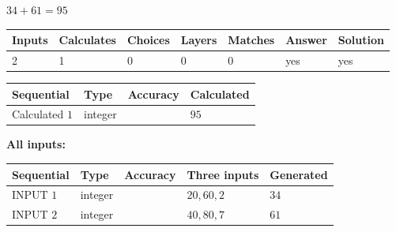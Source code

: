 \documentclass[12pt]{article}
\begin{document}
 
\noindent{}
 
 

 
 
 
\noindent{}
 
 

$ %
34 +  %
61=   %
95$
 
 
\noindent{}
 
 

 
   
   
   
   
\noindent\begin{tabular}{|l|l|l|l|l|l|l|}
 \hline
Inputs & Calculates & Choices & Layers & Matches & Answer & Solution \\ \hline
 2  & 
 1  & 
 0
  & 
 0  & 
 0  & 
  yes & 
  yes 
  \\ \hline
 \end{tabular}
   
   
   
   
\noindent{}
   
   
  
  
\noindent\begin{tabular}{|l|l|l|l|}
\hline
 Sequential & Type & Accuracy & Calculated \\ 
\hline
 
 
  Calculated $  1 $ & integer &  & 
  $ 95 $ 
 \\  \hline  
 \end{tabular}
   
   
   
   
\noindent\vspace{0.1in}\hspace{-0.08in} {\textbf{\Large{All inputs: }}}
   
   
  
  
\noindent\begin{tabular}{|l|l|l|l|l|}
\hline
 Sequential & Type & Accuracy & Three inputs & Generated \\ 
\hline
 
 
  INPUT $  1 $ & integer &  & $
 20
 , 
 60
 , 
 2
 $ & $ 34 $ 
 \\  \hline  
 
 
  INPUT $  2 $ & integer &  & $
 40
 , 
 80
 , 
 7
 $ & $ 61 $ 
 \\  \hline  
 \end{tabular}
   
\end{document}
